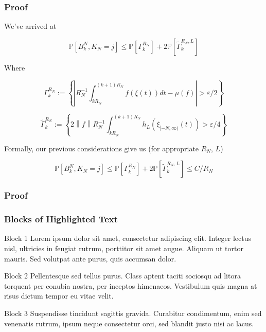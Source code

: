 \documentclass{beamer}
\newcommand{\norm}[1]{{\left\lVert#1\right\rVert}}
\begin{document}
\begin{frame}
    \frametitle{Proof}
    We've arrived at

    \[
        \mathbb{P}\left[ B^N_k, K_N = j \right] \leq \mathbb{P}\left[\Gamma_k^{R_N}\right] + 2\mathbb{P}\left[\tilde{\Gamma}_k^{R_N, L}\right]
    \]

    Where

    \[
        \Gamma_k^{R_N} := \left\{  \left|R_N^{-1}\int_{kR_N}^{(k+1)R_N}f(\xi(t))dt - \mu(f)\right| > \varepsilon/2\right\}
    \]

    \[
        \tilde{\Gamma}_k^{R_N} := \left\{  2\norm{f}R_N^{-1}\int_{kR_N}^{(k+1)R_N}h_L(\xi_{[-N, \infty)}(t)) > \varepsilon/4\right\}
    \]

    Formally, our previous considerations give us (for appropriate $R_N$, $L$)

    \[
        \mathbb{P}\left[ B^N_k, K_N = j \right] \leq \mathbb{P}\left[\Gamma_k^{R_N}\right] + 2\mathbb{P}\left[\tilde{\Gamma}_k^{R_N, L}\right] \leq C/R_N
    \]
\end{frame}

\begin{frame}
    \frametitle{Proof}
\end{frame}


\begin{frame}
\frametitle{Blocks of Highlighted Text}
\begin{block}{Block 1}
Lorem ipsum dolor sit amet, consectetur adipiscing elit. Integer lectus nisl, ultricies in feugiat rutrum, porttitor sit amet augue. Aliquam ut tortor mauris. Sed volutpat ante purus, quis accumsan dolor.
\end{block}

\begin{block}{Block 2}
Pellentesque sed tellus purus. Class aptent taciti sociosqu ad litora torquent per conubia nostra, per inceptos himenaeos. Vestibulum quis magna at risus dictum tempor eu vitae velit.
\end{block}

\begin{block}{Block 3}
Suspendisse tincidunt sagittis gravida. Curabitur condimentum, enim sed venenatis rutrum, ipsum neque consectetur orci, sed blandit justo nisi ac lacus.
\end{block}
\end{frame}

\end{document}
